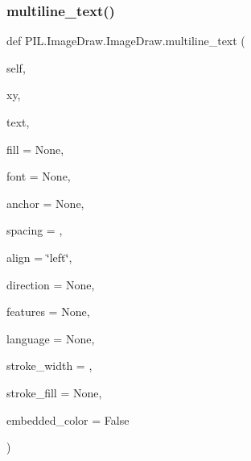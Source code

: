 \subsubsection{\texorpdfstring{multiline\+\_\+text()}{multiline\_text()}}
{\footnotesize\ttfamily def P\+I\+L.\+Image\+Draw.\+Image\+Draw.\+multiline\+\_\+text (\begin{DoxyParamCaption}\item[{}]{self,  }\item[{}]{xy,  }\item[{}]{text,  }\item[{}]{fill = {\ttfamily None},  }\item[{}]{font = {\ttfamily None},  }\item[{}]{anchor = {\ttfamily None},  }\item[{}]{spacing = {},  }\item[{}]{align = {\ttfamily \char`\"{}left\char`\"{}},  }\item[{}]{direction = {\ttfamily None},  }\item[{}]{features = {\ttfamily None},  }\item[{}]{language = {\ttfamily None},  }\item[{}]{stroke\+\_\+width = {},  }\item[{}]{stroke\+\_\+fill = {\ttfamily None},  }\item[{}]{embedded\+\_\+color = {\ttfamily False} }\end{DoxyParamCaption})}

\mbox{\label{classPIL_1_1ImageDraw_1_1ImageDraw_ae071b54917d5a612d97e67b7711f1d6c}} 

